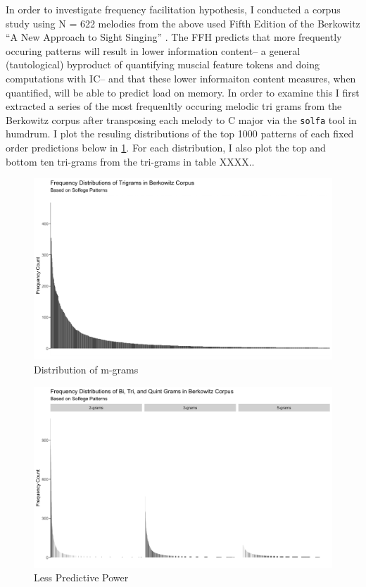 \documentclass[]{book}
\begin{document}
In order to investigate frequency facilitation hypothesis, I conducted a corpus study using N = 622 melodies from the above used Fifth Edition of the Berkowitz ``A New Approach to Sight Singing'' \citep{berkowitzNewApproachSight2011}.
The FFH predicts that more frequently occuring patterns will result in lower information content-- a general (tautological) byproduct of quantifying muscial feature tokens and doing computations with IC-- and that these lower informaiton content measures, when quantified, will be able to predict load on memory.
In order to examine this I first extracted a series of the most frequenltly occuring melodic tri grams from the Berkowitz corpus after transposing each melody to C major via the \texttt{solfa} tool in humdrum.
I plot the resuling distributions of the top 1000 patterns of each fixed order predictions below in \ref{fig:bitriquint}.
For each distribution, I also plot the top and bottom ten tri-grams from the tri-grams in table XXXX..

\begin{figure}

{\centering \includegraphics[width=1\linewidth]{img/trigrams} 

}

\caption{Distribution of m-grams}\label{fig:bitriquint}
\end{figure}

\begin{figure}

{\centering \includegraphics[width=1\linewidth]{img/bitriquint} 

}

\caption{Less Predictive Power}\label{fig:bitriquint2}
\end{figure}
\end{document}
